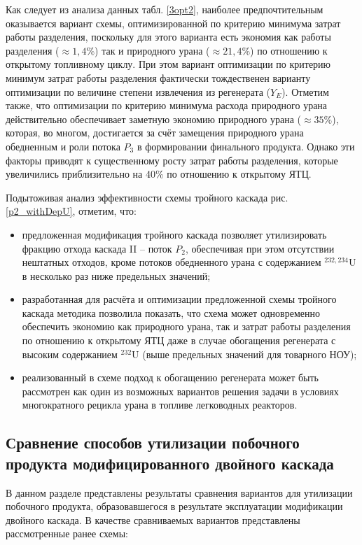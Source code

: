 Как следует из анализа данных табл. \ref{3opt2}, наиболее предпочтительным оказывается вариант схемы, оптимизированной по критерию минимума затрат работы разделения, поскольку для этого варианта есть экономия как работы разделения ($\approx 1,4\%$) так и природного урана ($\approx 21,4\%$) по отношению к открытому топливному циклу. При этом вариант оптимизации по критерию минимум затрат работы разделения фактически тождественен варианту оптимизации по величине степени извлечения из регенерата ($Y_E$). Отметим также, что оптимизации по критерию минимума расхода природного урана действительно обеспечивает заметную экономию природного урана ($\approx 35\%$), которая, во многом, достигается за счёт замещения природного урана обедненным и роли потока $P_3$ в формировании финального продукта. Однако эти факторы приводят к существенному росту затрат работы разделения, которые увеличились приблизительно на 40\% по отношению к открытому ЯТЦ.

Подытоживая анализ эффективности схемы тройного каскада рис. \ref{p2_withDepU}, отметим, что:

\begin{itemize}
    \item предложенная модификация тройного каскада позволяет утилизировать фракцию отхода каскада II -- поток $P_2$, обеспечивая при этом отсутствии нештатных отходов, кроме потоков обедненного урана с содержанием $^{232,234}$U в несколько раз ниже предельных значений; 
    \item разработанная для расчёта и оптимизации предложенной схемы тройного каскада методика позволила показать, что схема может одновременно обеспечить экономию как природного урана, так и затрат работы разделения по отношению к открытому ЯТЦ даже в случае обогащения регенерата с высоким содержанием $^{232}$U (выше предельных значений для товарного НОУ); 
    \item реализованный в схеме подход к обогащению регенерата может быть рассмотрен как один из возможных вариантов решения задачи в условиях многократного рецикла урана в топливе легководных реакторов.
\end{itemize}

\subsection{Сравнение способов утилизации побочного продукта модифицированного двойного каскада}

В данном разделе представлены результаты сравнения вариантов для утилизации побочного продукта, образовавшегося в результате эксплуатации модификации двойного каскада. В качестве сравниваемых вариантов представлены  рассмотренные ранее схемы: 

